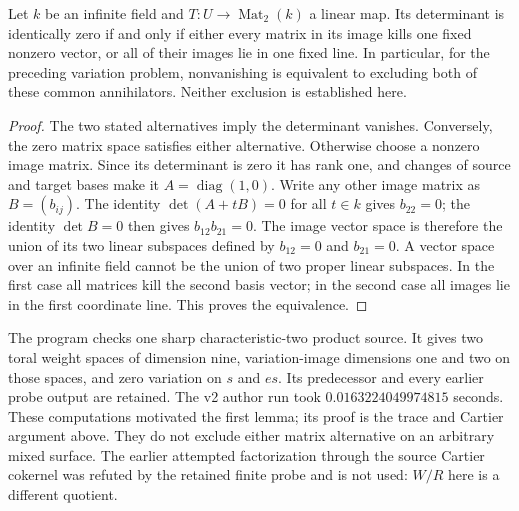 \begin{lemma}
\label{lem:DE-A3-positive-matrix-ruling}
Let $k$ be an infinite field and $T:U\to\operatorname{Mat}_2(k)$
a linear map. Its determinant is identically zero if and only if
either every matrix in its image kills one fixed nonzero vector,
or all of their images lie in one fixed line.
In particular, for the preceding variation problem, nonvanishing
is equivalent to excluding both of these common annihilators.
Neither exclusion is established here.
\end{lemma}
\begin{proof}
The two stated alternatives imply the determinant vanishes.
Conversely, the zero matrix space satisfies either alternative.
Otherwise choose a nonzero image matrix. Since its determinant
is zero it has rank one, and changes of source and target bases
make it $A=\operatorname{diag}(1,0)$.
Write any other image matrix as $B=(b_{ij})$.
The identity $\det(A+tB)=0$ for all $t\in k$ gives $b_{22}=0$;
the identity $\det B=0$ then gives $b_{12}b_{21}=0$.
The image vector space is therefore the union of its two linear
subspaces defined by $b_{12}=0$ and $b_{21}=0$.
A vector space over an infinite field cannot be the union of
two proper linear subspaces. In the first case all matrices kill
the second basis vector; in the second case all images lie in
the first coordinate line. This proves the equivalence.
\end{proof}

\begin{remark}
\label{rem:DE-A3-positive-trace-probe-scope}
The program
checks one sharp characteristic-two product source. It gives
two toral weight spaces of dimension nine, variation-image
dimensions one and two on those spaces, and zero variation on
$s$ and $es$. Its predecessor and every earlier probe output are
retained. The v2 author run took $0.0163224049974815$ seconds.
These computations motivated the first lemma; its
proof is the trace and Cartier argument above. They do not
exclude either matrix alternative on an arbitrary mixed surface.
The earlier attempted factorization through the source Cartier
cokernel was refuted by the retained finite probe and is not
used: $W/R$ here is a different quotient.
\end{remark}
